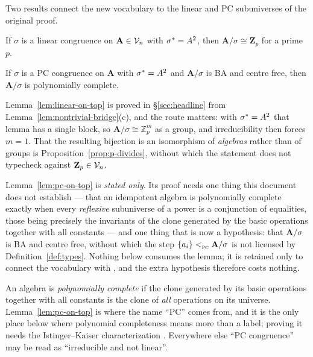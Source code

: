 Two results connect the new vocabulary to the linear and PC subuniverses of the
original proof.

\begin{lemma}\label{lem:linear-on-top}
If $\sigma$ is a linear congruence on $\mathbf A\in\mathcal V_{n}$ with
$\sigma^{*}=A^{2}$, then $\mathbf A/\sigma\cong\mathbf Z_{p}$ for a prime
$p$.
\end{lemma}

\begin{lemma}\label{lem:pc-on-top}
If $\sigma$ is a PC congruence on $\mathbf A$ with $\sigma^{*}=A^{2}$ and
$\mathbf A/\sigma$ is BA and centre free, then $\mathbf A/\sigma$ is
polynomially complete.
\end{lemma}

\begin{hazard}\label{haz:on-top}
Lemma~\ref{lem:linear-on-top} is proved in \S\ref{sec:headline} from
Lemma~\ref{lem:nontrivial-bridge}(c), and the route matters: with
$\sigma^{*}=A^{2}$ that lemma has a single block, so
$\mathbf A/\sigma\cong\mathbb Z_{p}^{m}$ as a group, and irreducibility then
forces $m=1$. That the resulting bijection is an isomorphism of \emph{algebras}
rather than of groups is Proposition~\ref{prop:p-divides}, without which the
statement does not typecheck against $\mathbf Z_{p}\in\mathcal V_{n}$.

Lemma~\ref{lem:pc-on-top} is \emph{stated only}. Its proof needs one thing
this document does not establish --- that an idempotent algebra is polynomially
complete exactly when every \emph{reflexive} subuniverse of a power is a
conjunction of equalities, those being precisely the invariants of the clone
generated by the basic operations together with all constants --- and one thing
that is now a hypothesis: that $\mathbf A/\sigma$ is BA and centre free,
without which the step $\{a_{i}\}<_{\textup{\textsc{pc}}}^{}\mathbf A/\sigma$ is not licensed
by Definition~\ref{def:types}. Nothing below consumes the lemma; it is
retained only to connect the vocabulary with \cite{ZhukJACM}, and the extra
hypothesis therefore costs nothing.
\end{hazard}

\begin{hazard}\label{haz:pc-algebra}
An algebra is \emph{polynomially complete} if the clone generated by its basic
operations together with all constants is the clone of \emph{all} operations on
its universe. Lemma~\ref{lem:pc-on-top} is where the name ``PC'' comes from,
and it is the only place below where polynomial completeness means more than a
label; proving it needs the Istinger--Kaiser characterization
\cite{IstingerKaiser}. Everywhere else ``PC congruence'' may be read as
``irreducible and not linear''.
\end{hazard}

